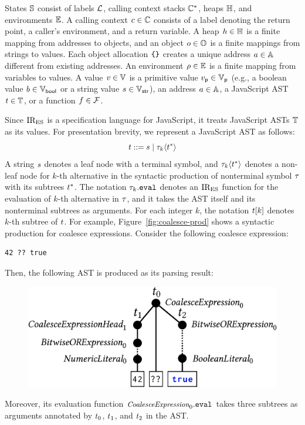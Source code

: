 States $\mathbb{S}$ consist of labels $\mathcal{L}$, calling context stacks
$\mathbb{C}^*$, heaps $\mathbb{H}$, and environments $\mathbb{E}$.  A calling context
$c \in \mathbb{C}$ consists of a label denoting the return point, a caller's
environment, and a return variable.  A heap $h \in \mathbb{H}$ is a finite
mapping from addresses to objects, and an object $o \in \mathbb{O}$ is a finite
mappings from strings to values.  Each object allocation $\texttt{\{} \texttt{\}}$ creates a
unique address $a \in \mathbb{A}$ different from existing addresses.  An
environment $\rho \in \mathbb{E}$ is a finite mapping from variables to values. A
value $v \in \mathbb{V}$ is a primitive value $v_{\textsf{p}} \in \mathbb{V}_{\textsf{p}}$ (e.g., a
boolean value $b \in \mathbb{V}_{\textsf{bool}}$ or a string value $s \in \mathbb{V}_{\textsf{str}}$), an
address $a \in \mathbb{A}$, a JavaScript AST $t \in \mathbb{T}$, or a
function $f \in \mathcal{F}$.

Since $\text{IR}_\text{ES}$ is a specification language for JavaScript, it treats JavaScript
ASTs $\mathbb{T}$ as its values. For presentation brevity, we represent a JavaScript
AST as follows:
\[
  t ::= s \mid \tau_k \langle t^* \rangle
\]
A string $s$ denotes a leaf node with a terminal symbol, and $\tau_k \langle
t^* \rangle$ denotes a non-leaf node for $k$-th alternative in the syntactic
production of nonterminal symbol $\tau$ with its subtrees $t^*$.  The notation
$\tau_k.\texttt{eval}$ denotes an $\text{IR}_\text{ES}$ function for the evaluation of $k$-th
alternative in $\tau$, and it takes the AST itself and its nonterminal subtrees
as arguments. For each integer $k$, the notation $t[k]$ denotes $k$-th
subtree of $t$.  For example, Figure~\ref{fig:coalesce-prod} shows a
syntactic production for coalesce expressions.  Consider the following coalesce
expression:
\begin{lstlisting}[style=JS]
                    42 ?? true
\end{lstlisting}
Then, the following AST is produced as its parsing result:
\begin{figure}[H]
  \includegraphics[width=.8\columnwidth]{img/ast-example.png}
\end{figure}
\noindent Moreover, its evaluation function $\textit{\small CoalesceExpression}_0.\texttt{eval}$
takes three subtrees as arguments annotated by $t_0$, $t_1$, and
$t_2$ in the AST.



